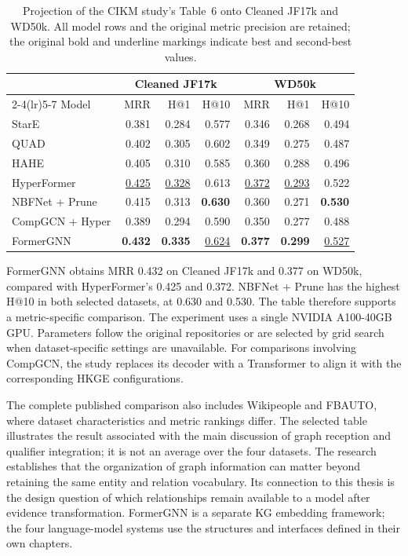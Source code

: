 \begin{table}[tbp]
\centering
\caption{Projection of the CIKM study's Table~6 onto Cleaned JF17k and WD50k. All model rows and the original metric precision are retained; the original bold and underline markings indicate best and second-best values.}
\label{tab:background:formergnn}
\small
\begin{tabular}{lrrrrrr}
\toprule
&\multicolumn{3}{c}{Cleaned JF17k}&\multicolumn{3}{c}{WD50k}\\
\cmidrule(lr){2-4}\cmidrule(lr){5-7}
Model&MRR&H@1&H@10&MRR&H@1&H@10\\
\midrule
StarE&0.381&0.284&0.577&0.346&0.268&0.494\\
QUAD&0.402&0.305&0.602&0.349&0.275&0.487\\
HAHE&0.405&0.310&0.585&0.360&0.288&0.496\\
HyperFormer&\underline{0.425}&\underline{0.328}&0.613&\underline{0.372}&\underline{0.293}&0.522\\
NBFNet + Prune&0.415&0.313&\textbf{0.630}&0.360&0.271&\textbf{0.530}\\
CompGCN + Hyper&0.389&0.294&0.590&0.350&0.277&0.488\\
FormerGNN&\textbf{0.432}&\textbf{0.335}&\underline{0.624}&\textbf{0.377}&\textbf{0.299}&\underline{0.527}\\
\bottomrule
\end{tabular}
\end{table}

FormerGNN obtains MRR 0.432 on Cleaned JF17k and 0.377 on WD50k, compared with HyperFormer's 0.425 and 0.372. NBFNet + Prune has the highest H@10 in both selected datasets, at 0.630 and 0.530. The table therefore supports a metric-specific comparison. The experiment uses a single NVIDIA A100-40GB GPU. Parameters follow the original repositories or are selected by grid search when dataset-specific settings are unavailable. For comparisons involving CompGCN, the study replaces its decoder with a Transformer to align it with the corresponding HKGE configurations.

The complete published comparison also includes Wikipeople and FBAUTO, where dataset characteristics and metric rankings differ. The selected table illustrates the result associated with the main discussion of graph reception and qualifier integration; it is not an average over the four datasets. The research establishes that the organization of graph information can matter beyond retaining the same entity and relation vocabulary. Its connection to this thesis is the design question of which relationships remain available to a model after evidence transformation. FormerGNN is a separate KG embedding framework; the four language-model systems use the structures and interfaces defined in their own chapters.

